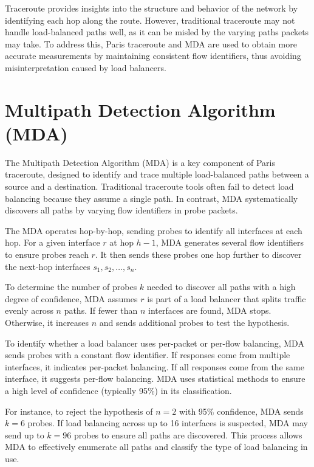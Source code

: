 \documentclass[12pt]{cwru_thesis}
\begin{document}
Traceroute provides insights into the structure and behavior of the network by identifying each hop along the route. However, traditional traceroute may not handle load-balanced paths well, as it can be misled by the varying paths packets may take. To address this, Paris traceroute and MDA are used to obtain more accurate measurements by maintaining consistent flow identifiers, thus avoiding misinterpretation caused by load balancers.

\section{Multipath Detection Algorithm (MDA)}

The Multipath Detection Algorithm (MDA) is a key component of Paris traceroute, designed to identify and trace multiple load-balanced paths between a source and a destination. Traditional traceroute tools often fail to detect load balancing because they assume a single path. In contrast, MDA systematically discovers all paths by varying flow identifiers in probe packets.

The MDA operates hop-by-hop, sending probes to identify all interfaces at each hop. For a given interface \(r\) at hop \(h-1\), MDA generates several flow identifiers to ensure probes reach \(r\). It then sends these probes one hop further to discover the next-hop interfaces \(s_1, s_2, \ldots, s_n\).

To determine the number of probes \(k\) needed to discover all paths with a high degree of confidence, MDA assumes \(r\) is part of a load balancer that splits traffic evenly across \(n\) paths. If fewer than \(n\) interfaces are found, MDA stops. Otherwise, it increases \(n\) and sends additional probes to test the hypothesis.

To identify whether a load balancer uses per-packet or per-flow balancing, MDA sends probes with a constant flow identifier. If responses come from multiple interfaces, it indicates per-packet balancing. If all responses come from the same interface, it suggests per-flow balancing. MDA uses statistical methods to ensure a high level of confidence (typically 95\%) in its classification.

For instance, to reject the hypothesis of \(n = 2\) with 95\% confidence, MDA sends \(k = 6\) probes. If load balancing across up to 16 interfaces is suspected, MDA may send up to \(k = 96\) probes to ensure all paths are discovered. This process allows MDA to effectively enumerate all paths and classify the type of load balancing in use.
\end{document}
